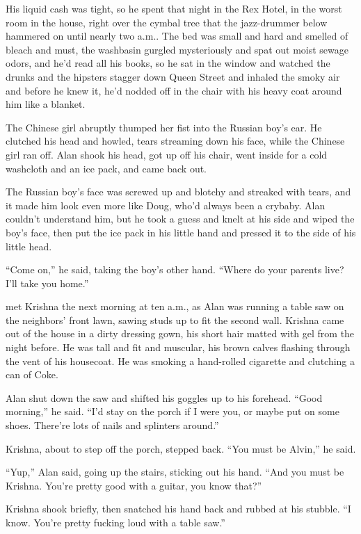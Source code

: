 His liquid cash was tight, so he spent that night in the Rex Hotel, in
the worst room in the house, right over the cymbal tree that the
jazz-drummer below hammered on until nearly two a.m..  The bed was
small and hard and smelled of bleach and must, the washbasin gurgled
mysteriously and spat out moist sewage odors, and he'd read all his
books, so he sat in the window and watched the drunks and the hipsters
stagger down Queen Street and inhaled the smoky air and before he knew
it, he'd nodded off in the chair with his heavy coat around him like a
blanket.

The Chinese girl abruptly thumped her fist into the Russian boy's ear. 
He clutched his head and howled, tears streaming down his face, while
the Chinese girl ran off.  Alan shook his head, got up off his chair,
went inside for a cold washcloth and an ice pack, and came back out.

The Russian boy's face was screwed up and blotchy and streaked with
tears, and it made him look even more like Doug, who'd always been a
crybaby.  Alan couldn't understand him, but he took a guess and knelt
at his side and wiped the boy's face, then put the ice pack in his
little hand and pressed it to the side of his little head.

``Come on,'' he said, taking the boy's other hand.  ``Where do your
parents live?  I'll take you home.''

 met Krishna the next morning at ten a.m., as Alan was running a
table saw on the neighbors' front lawn, sawing studs up to fit the
second wall.  Krishna came out of the house in a dirty dressing gown,
his short hair matted with gel from the night before.  He was tall and
fit and muscular, his brown calves flashing through the vent of his
housecoat.  He was smoking a hand-rolled cigarette and clutching a can
of Coke.

Alan shut down the saw and shifted his goggles up to his forehead. 
``Good morning,'' he said.  ``I'd stay on the porch if I were you, or
maybe put on some shoes.  There're lots of nails and splinters
around.''

Krishna, about to step off the porch, stepped back.  ``You must be
Alvin,'' he said.

``Yup,'' Alan said, going up the stairs, sticking out his hand.  ``And
you must be Krishna.  You're pretty good with a guitar, you know
that?''

Krishna shook briefly, then snatched his hand back and rubbed at his
stubble.  ``I know.  You're pretty fucking loud with a table saw.''

